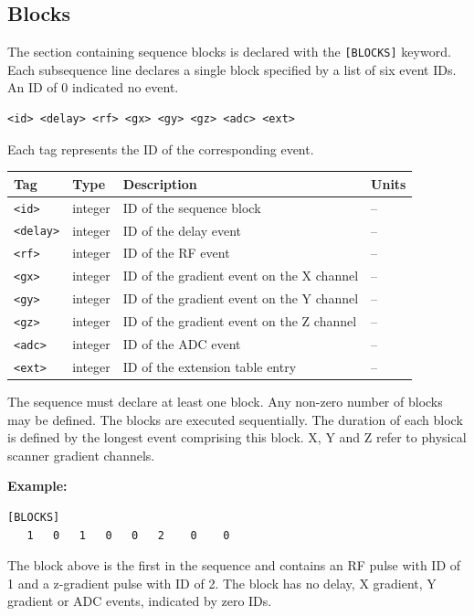 \documentclass{article}
\begin{document}
\subsection{Blocks}

The section containing sequence blocks is declared with the \verb.[BLOCKS]. keyword. Each subsequence line declares a single block specified by a list of six event IDs. An ID of 0 indicated no event.
\begin{lstlisting}
<id> <delay> <rf> <gx> <gy> <gz> <adc> <ext>
\end{lstlisting}

Each tag represents the ID of the corresponding event.

\begin{tabularx}{\textwidth}{llXl}
\toprule
Tag & Type & Description & Units\\
\midrule
\verb.<id>. & integer & ID of the sequence block & -- \\
\verb.<delay>. & integer & ID of the delay event & -- \\
\verb.<rf>. & integer & ID of the RF event & -- \\
\verb.<gx>. & integer & ID of the gradient event on the X channel & --\\
\verb.<gy>. & integer & ID of the gradient event on the Y channel & -- \\
\verb.<gz>. & integer & ID of the gradient event on the Z channel & -- \\
\verb.<adc>. & integer & ID of the ADC event & -- \\
\verb.<ext>. & integer & ID of the extension table entry & -- \\
\bottomrule
\end{tabularx}

\begin{minipage}{\textwidth}
The sequence must declare at least one block. Any non-zero number of blocks may be defined. The blocks are executed sequentially. The duration of each block is defined by the longest event comprising this block. X, Y and Z refer to physical scanner gradient channels.


\textbf{Example:}
\begin{lstlisting}
[BLOCKS]
   1   0   1   0   0   2    0    0
\end{lstlisting}
\end{minipage}

The block above is the first in the sequence and contains an RF pulse with ID of 1 and a z-gradient pulse with ID of 2. The block has no delay, X gradient, Y gradient or ADC events, indicated by zero IDs.
\end{document}
